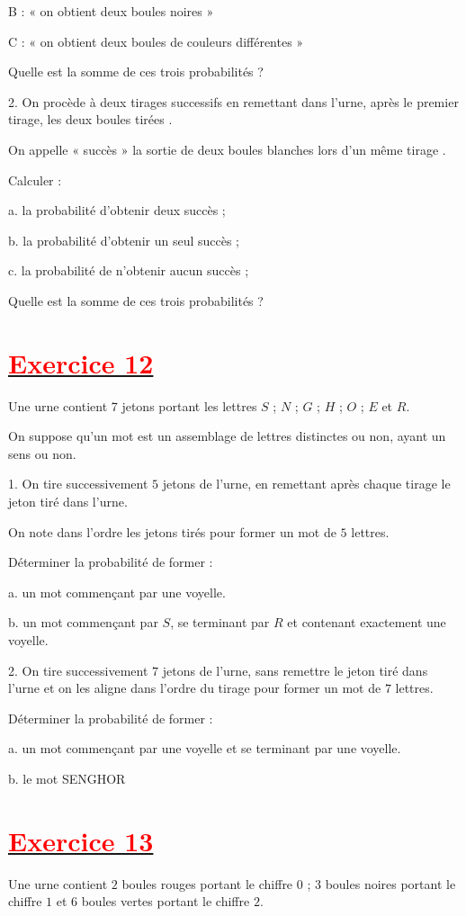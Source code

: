 \documentclass[12pt]{article}
\begin{document}
B : « on obtient deux boules noires »

C : « on obtient deux boules de couleurs différentes »

Quelle est la somme de ces trois probabilités ?

	2. On procède à deux tirages successifs en remettant dans l'urne, après le premier tirage, les deux boules tirées .

On appelle « succès » la sortie de deux boules blanches lors d'un même tirage .

Calculer :

	a. la probabilité d'obtenir deux succès ;

b. la probabilité d'obtenir un seul succès ;

c. la probabilité de n'obtenir aucun succès ; 

Quelle est la somme de ces trois probabilités ?
\section*{\underline{\textbf{\textcolor{red}{Exercice 12}}}}
Une urne contient 7 jetons portant les lettres $S$ ; $N$ ; $G$ ; $H$ ; $O$ ; $E$ et $R.$
	
On suppose qu'un mot est un assemblage de lettres distinctes ou non, ayant un sens ou non.

1. On tire successivement $5$ jetons de l'urne, en remettant après chaque tirage le jeton tiré dans l'urne.

On note dans l'ordre les jetons tirés pour former un mot de $5$ lettres.

Déterminer la probabilité de former :

a. un mot commençant par une voyelle.

b. un mot commençant par $S$, se terminant par $R$ et contenant exactement une voyelle.

2. On tire successivement $7$ jetons de l'urne, sans remettre le jeton tiré dans l'urne et on les aligne dans l'ordre du tirage pour former un mot de $7$ lettres.

Déterminer la probabilité de former :

a. un mot commençant par une voyelle et se terminant par une voyelle.

b. le mot SENGHOR
\section*{\underline{\textbf{\textcolor{red}{Exercice 13}}}}
Une urne contient $2$ boules rouges portant le chiffre $0$ ; $3$ boules noires portant le chiffre $1$ et $6$ boules vertes portant le chiffre $2.$
\end{document}
